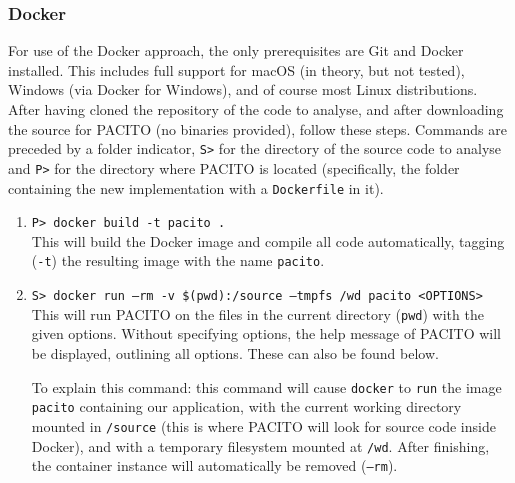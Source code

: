 \subsubsection{Docker}
For use of the Docker approach, the only prerequisites are Git and Docker installed. This includes full support for macOS (in theory, but not tested), Windows (via Docker for Windows), and of course most Linux distributions. After having cloned the repository of the code to analyse, and after downloading the source for PACITO (no binaries provided), follow these steps. Commands are preceded by a folder indicator, {\tt S>} for the directory of the source code to analyse and {\tt P>} for the directory where PACITO is located (specifically, the folder containing the new implementation with a {\tt Dockerfile} in it).
\begin{enumerate}[label=\bf\arabic*)]
    \item {\tt P> docker build -t pacito .} \\ This will build the Docker image and compile all code automatically, tagging ({\tt -t}) the resulting image with the name {\tt pacito}.
    \item {\tt S> docker run --rm -v \$(pwd):/source --tmpfs /wd pacito <OPTIONS>} \\ This will run PACITO on the files in the current directory ({\tt pwd}) with the given options. Without specifying options, the help message of PACITO will be displayed, outlining all options. These can also be found below.
    
    To explain this command: this command will cause {\tt docker} to {\tt run} the image {\tt pacito} containing our application, with the current working directory mounted in {\tt /source} (this is where PACITO will look for source code inside Docker), and with a temporary filesystem mounted at {\tt /wd}. After finishing, the container instance will automatically be removed ({\tt --rm}).
\end{enumerate}

